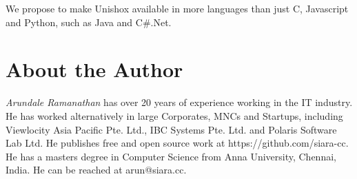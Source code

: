 \documentclass[]{article}
\begin{document}
We propose to make Unishox available in more languages than just C, Javascript and Python, such as Java and C\#.Net.

\section{About the Author}

\emph{Arundale Ramanathan} has over 20 years of experience working in the IT industry.  He has worked alternatively in large Corporates, MNCs and Startups, including Viewlocity Asia Pacific Pte. Ltd., IBC Systems Pte. Ltd. and Polaris Software Lab Ltd. He publishes free and open source work at https://github.com/siara-cc. He has a masters degree in Computer Science from Anna University, Chennai, India.  He can be reached at arun@siara.cc.
\end{document}
